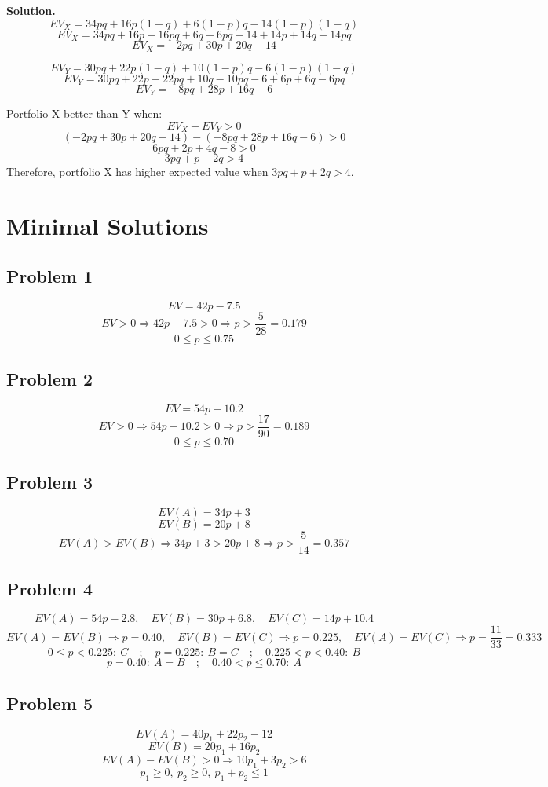 \begin{ExamProblems}
		\textbf{Solution.}
		\[
		EV_X=34pq+16p(1-q)+6(1-p)q-14(1-p)(1-q)
		\]
		\[
		EV_X=34pq+16p-16pq+6q-6pq-14+14p+14q-14pq
		\]
		\[
		EV_X=-2pq+30p+20q-14
		\]
		
		\[
		EV_Y=30pq+22p(1-q)+10(1-p)q-6(1-p)(1-q)
		\]
		\[
		EV_Y=30pq+22p-22pq+10q-10pq-6+6p+6q-6pq
		\]
		\[
		EV_Y=-8pq+28p+16q-6
		\]
		
		Portfolio X better than Y when:
		\[
		EV_X-EV_Y>0
		\]
		\[
		(-2pq+30p+20q-14)-(-8pq+28p+16q-6)>0
		\]
		\[
		6pq+2p+4q-8>0
		\]
		\[
		3pq+p+2q>4
		\]
		Therefore, portfolio X has higher expected value when \(3pq+p+2q>4\).
		
	\end{ExamProblems}
	

\section{Minimal Solutions}
\subsection*{Problem 1}
\[
EV=42p-7.5
\]
\[
EV>0\Rightarrow 42p-7.5>0\Rightarrow p>\frac{5}{28}=0.179
\]
\[
0\le p\le0.75
\]

\subsection*{Problem 2}
\[
EV=54p-10.2
\]
\[
EV>0\Rightarrow 54p-10.2>0\Rightarrow p>\frac{17}{90}=0.189
\]
\[
0\le p\le0.70
\]

\subsection*{Problem 3}
\[
EV(A)=34p+3
\]
\[
EV(B)=20p+8
\]
\[
EV(A)>EV(B)\Rightarrow 34p+3>20p+8\Rightarrow p>\frac{5}{14}=0.357
\]

\subsection*{Problem 4}
\[
EV(A)=54p-2.8,\quad EV(B)=30p+6.8,\quad EV(C)=14p+10.4
\]
\[
EV(A)=EV(B)\Rightarrow p=0.40,\quad EV(B)=EV(C)\Rightarrow p=0.225,\quad EV(A)=EV(C)\Rightarrow p=\frac{11}{33}=0.333
\]
\[
0\le p<0.225:\ C\quad ;\quad p=0.225:\ B=C\quad ;\quad 0.225<p<0.40:\ B
\]
\[
p=0.40:\ A=B\quad ;\quad 0.40<p\le0.70:\ A
\]

\subsection*{Problem 5}
\[
EV(A)=40p_1+22p_2-12
\]
\[
EV(B)=20p_1+16p_2
\]
\[
EV(A)-EV(B)>0\Rightarrow 10p_1+3p_2>6
\]
\[
p_1\ge0,\ p_2\ge0,\ p_1+p_2\le1
\]

